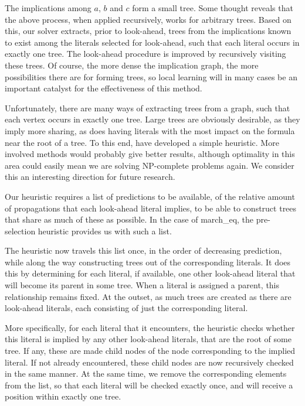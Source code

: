 \documentclass[twoside,11pt]{article}
\begin{document}
The implications among $a$, $b$ and $c$ form a small tree. Some thought reveals that the above process, when
applied recursively, works for arbitrary trees. Based on this, our solver extracts, prior to look-ahead, 
trees from the implications known to exist among the literals selected for look-ahead, such that each
literal occurs in exactly one tree. The look-ahead procedure is improved by recursively visiting these
trees. Of course, the more dense the implication graph, the more possibilities there are for forming
trees, so local learning will in many cases be an important catalyst for the effectiveness of this method.

Unfortunately, there are many ways of extracting trees from a graph, such that each vertex occurs in exactly
one tree. Large trees are obviously desirable, as they imply more sharing, as does having literals with the
most impact on the formula near the root of a tree. To this end, have developed a simple heuristic. More
involved methods would probably give better results, although optimality in this area could easily mean we
are solving NP-complete problems again. We consider this an interesting direction for future research.

Our heuristic requires a list of predictions to be available, of the relative amount of propagations that
each look-ahead literal implies, to be able to construct trees that share as much of these as possible. 
In the case of {\sf march\_eq}, the pre-selection heuristic provides us with such a list.

The heuristic now travels this list once, in the order of decreasing prediction, while along the way 
constructing trees out of the corresponding literals. It does this by determining for each literal, 
if available, one other look-ahead literal that will become its parent in some tree. When a literal 
is assigned a parent, this relationship remains fixed. At the outset, as much trees are created as 
there are look-ahead literals, each consisting of just the corresponding literal.

More specifically, for each literal that it encounters, the heuristic checks whether this literal
is implied by any other look-ahead literals, that are the root of some tree. If any, these are made 
child nodes of the node corresponding to the implied literal. If not already encountered, these child 
nodes are now recursively checked in the same manner. At the same time, we remove the corresponding 
elements from the list, so that each literal will be checked exactly once, and will receive a position 
within exactly one tree.
\end{document}

